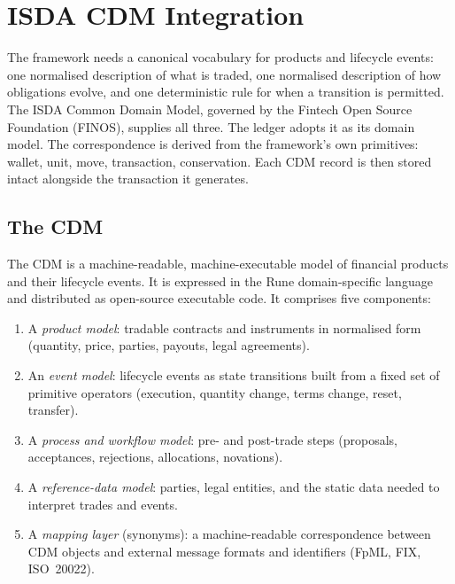 \section{ISDA CDM Integration}
\label{sec:cdm}

The framework needs a canonical vocabulary for products and lifecycle events: one normalised description of what is traded, one normalised description of how obligations evolve, and one deterministic rule for when a transition is permitted. The ISDA Common Domain Model, governed by the Fintech Open Source Foundation (FINOS), supplies all three. The ledger adopts it as its domain model. The correspondence is derived from the framework's own primitives: wallet, unit, move, transaction, conservation. Each CDM record is then stored intact alongside the transaction it generates.

\subsection{The CDM}

The CDM is a machine-readable, machine-executable model of financial products and their lifecycle events. It is expressed in the Rune domain-specific language and distributed as open-source executable code. It comprises five components:

\begin{enumerate}[nosep]
\item A \textit{product model}: tradable contracts and instruments in normalised form (quantity, price, parties, payouts, legal agreements).
\item An \textit{event model}: lifecycle events as state transitions built from a fixed set of primitive operators (execution, quantity change, terms change, reset, transfer).
\item A \textit{process and workflow model}: pre- and post-trade steps (proposals, acceptances, rejections, allocations, novations).
\item A \textit{reference-data model}: parties, legal entities, and the static data needed to interpret trades and events.
\item A \textit{mapping layer} (synonyms): a machine-readable correspondence between CDM objects and external message formats and identifiers (FpML, FIX, ISO~20022).
\end{enumerate}

